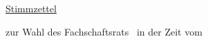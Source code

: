 

\geometry{a4paper,left=20mm,right=20mm, top=1cm, bottom=1cm} 

\parindent 0pt
\parskip 10pt




\begin{center}
\Huge \underline{Stimmzettel}
\end{center}
\begin{center}
\large
zur Wahl des Fachschaftsrats \fach ~in der Zeit vom \zeit
\end{center}
\LARGE
\pagestyle{empty}
\thispagestyle{empty}


